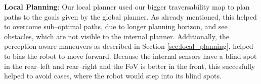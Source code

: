 \documentclass[letterpaper, 10pt, conference]{ieeeconf}      %
\newcommand{\ph}[1]{{\textbf{#1}:}} %
\begin{document}

\ph{Local Planning}
Our local planner used our bigger traversability map to plan paths to the goals given by the global planner.
As already mentioned, this helped to overcome sub--optimal paths, due to longer planning horizon, and see obstacles, which are not visible to the internal planner.
Additionally, the perception-aware maneuvers as described in Section \ref{sec:local_planning}, helped to bias the robot to move forward.
Because the internal sensors have a blind spot in the rear--left and rear--right and the FoV is better in the front, this succesfully helped to avoid cases, where the robot would step into its blind spots.

\end{document}
